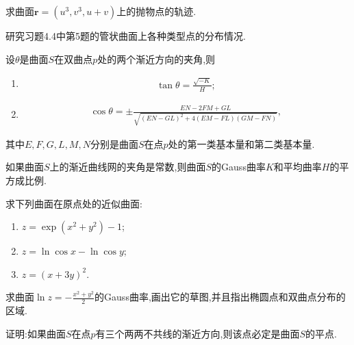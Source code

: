 \documentclass[../../main.tex]{subfiles}%
\begin{document}
\begin{example}
求曲面$\bm{r}=(u^3,v^3,u+v)$上的抛物点的轨迹.
\end{example}

\begin{example}
研究习题4.4中第5题的管状曲面上各种类型点的分布情况.
\end{example}

\begin{example}
设$\theta$是曲面$S$在双曲点$p$处的两个渐近方向的夹角,则
\begin{enumerate}[(1)]
\item \begin{align*}
\tan\theta=\frac{\sqrt{-K}}{H};
\end{align*}
\item \begin{align*}
\cos\theta=\pm\frac{EN-2FM+GL}{\sqrt{(EN-GL)^2+4(EM-FL)(GM-FN)}},
\end{align*}
\end{enumerate}
其中$E,F,G,L,M,N$分别是曲面$S$在点$p$处的第一类基本量和第二类基本量.
\end{example}

\begin{example}
如果曲面$S$上的渐近曲线网的夹角是常数,则曲面$S$的Gauss曲率$K$和平均曲率$H$的平方成比例.

\end{example}

\begin{example}
求下列曲面在原点处的近似曲面:
\begin{enumerate}[(1)]
\item $z=\exp(x^2+y^2)-1$;
\item $z=\ln\cos x-\ln\cos y$;
\item $z=(x+3y)^2$.
\end{enumerate}
\end{example}

\begin{example}
求曲面$\ln z=-\frac{x^2+y^2}{2}$的Gauss曲率,画出它的草图,并且指出椭圆点和双曲点分布的区域.
\end{example}

\begin{example}
证明:如果曲面$S$在点$p$有三个两两不共线的渐近方向,则该点必定是曲面$S$的平点.
\end{example}
\end{document}
